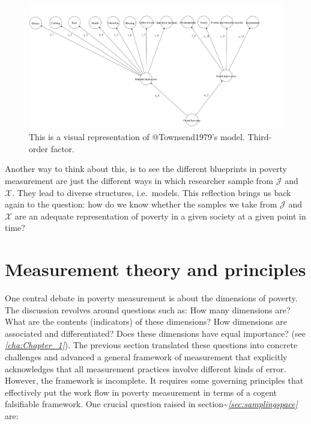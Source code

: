\documentclass[]{book}
\begin{document}
\begin{figure}[H]

{\centering \includegraphics[width=\textwidth]{Diagram_CFA_townsend} 

}

\caption{This is a visual representation of @Townsend1979's model. Third-order factor.}\label{fig:cfatownsend}
\end{figure}

Another way to think about this, is to see the different blueprints in poverty measurement are just the different ways in which researcher sample from \(\mathscr J\) and \(\mathscr X\). They lead to diverse structures, i.e.~models. This reflection brings us back again to the question: how do we know whether the samples we take from \(\mathscr J\) and \(\mathscr X\) are an adequate representation of poverty in a given society at a given point in time?

\hypertarget{measurement-theory-and-principles}{%
\section{Measurement theory and principles}\label{measurement-theory-and-principles}}

One central debate in poverty measurement is about the dimensions of poverty. The discussion revolves around questions such as: How many dimensions are? What are the contents (indicators) of these dimensions? How dimensions are associated and differentiated? Does these dimensions have equal importance? (see \emph{\ref{cha:Chapter_1}}). The previous section translated these questions into concrete challenges and advanced a general framework of measurement that explicitly acknowledges that all measurement practices involve different kinds of error. However, the framework is incomplete. It requires some governing principles that effectively put the work flow in poverty measurement in terms of a cogent falsifiable framework. One crucial question raised in section\textasciitilde{}\emph{\ref{sec:samplingspace}} are:
\end{document}
